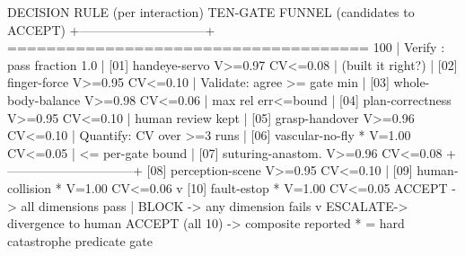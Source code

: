 \vspace{-0.2cm}


\vspace{-0.3cm}

\begin{asciifig}
DECISION RULE (per interaction)    TEN-GATE FUNNEL (candidates to ACCEPT)
+------------------------------+   ===================================== 100%
| Verify  : pass fraction 1.0  |    [01] handeye-servo      V>=0.97 CV<=0.08
|          (built it right?)   |    [02] finger-force       V>=0.95 CV<=0.10
| Validate: agree >= gate min  |    [03] whole-body-balance V>=0.98 CV<=0.06
|          max rel err<=bound  |    [04] plan-correctness   V>=0.95 CV<=0.10
|          human review kept   |    [05] grasp-handover     V>=0.96 CV<=0.10
| Quantify: CV over >=3 runs   |    [06] vascular-no-fly  * V=1.00  CV<=0.05
|          <= per-gate bound   |    [07] suturing-anastom.  V>=0.96 CV<=0.08
+------------------------------+    [08] perception-scene   V>=0.95 CV<=0.10
               |                    [09] human-collision  * V=1.00  CV<=0.06
               v                    [10] fault-estop      * V=1.00  CV<=0.05
 ACCEPT  -> all dimensions pass                         |
 BLOCK   -> any dimension fails                         v
 ESCALATE-> divergence to human     ACCEPT (all 10) -> composite reported
                                    * = hard catastrophe predicate gate
\end{asciifig}
\vspace{-0.6cm}

